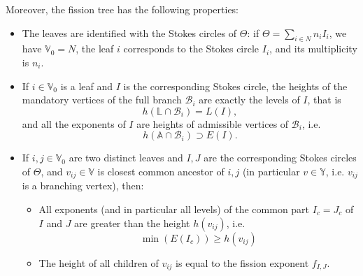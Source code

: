 \documentclass[11pt,a4paper]{amsart}
\numberwithin{equation}{section}
\begin{document}
Moreover, the fission tree has the following properties:
\begin{itemize}
\item The leaves are identified with the Stokes circles of $\Theta$: if $\Theta=\sum_{i\in N}n_i I_i$, we have $\mathbb V_0=N$, the leaf $i$ corresponds to the Stokes circle $I_i$, and its multiplicity is $n_i$.
\item If $i\in \mathbb V_0$ is a leaf and $I$ is the corresponding Stokes circle, the heights of the mandatory vertices of the full branch $\mathcal B_i$ are exactly the levels of $I$, that is
\[
h(\mathbb L\cap \mathcal B_i)=L(I),
\]
and all the exponents of $I$ are heights of admissible vertices of  $\mathcal B_i$, i.e. 
\[
h(\mathbb A\cap \mathcal B_i)\supset E(I).
\]
\item If $i,j\in \mathbb V_0$ are two distinct leaves and $I,J$ are the corresponding Stokes circles of $\Theta$, and $v_{ij}\in \mathbb V$ is closest common ancestor of $i,j$ (in particular $v\in \mathbb Y$, i.e. $v_{ij}$ is a branching vertex), then:
\begin{itemize}
 \item All exponents (and in particular all levels) of the common part $I_c=J_c$ of $I$ and $J$ are greater than the height $h(v_{ij})$, i.e. 
 \[
 \min(E(I_c))\geq h(v_{ij})
 \]
 \item The height of all children of $v_{ij}$ is equal to the fission exponent $f_{I,J}$.
\end{itemize}
\end{itemize}
\end{document}
